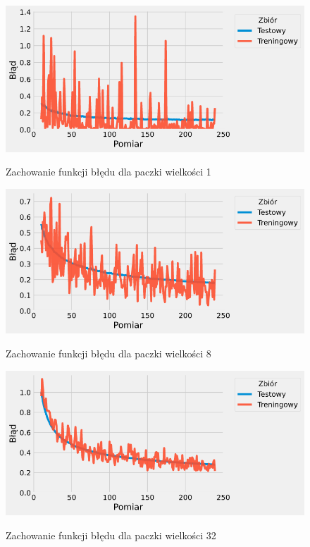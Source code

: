 \documentclass{article}
\begin{document}
\begin{figure}[H]
	\centering
	\caption{Zachowanie funkcji błędu dla paczki wielkości 1}
	\includegraphics[width=\textwidth]{batch_err_1.png}
	\label{fig:res23}
\end{figure}
\begin{figure}[H]
	\centering
	\caption{Zachowanie funkcji błędu dla paczki wielkości 8}
	\includegraphics[width=\textwidth]{batch_err_8.png}
	\label{fig:res24}
\end{figure}
\begin{figure}[H]
	\centering
	\caption{Zachowanie funkcji błędu dla paczki wielkości 32}
	\includegraphics[width=\textwidth]{batch_err_32.png}
	\label{fig:res25}
\end{figure}
\end{document}

